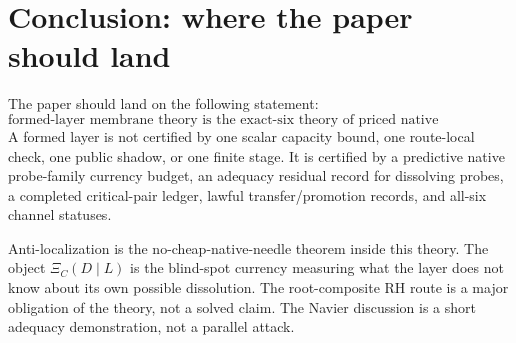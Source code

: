 \documentclass[11pt]{article}
\begin{document}
\section{Conclusion: where the paper should land}

The paper should land on the following statement:
\[
\boxed{\text{formed-layer membrane theory is the exact-six theory of priced native addressability.}}
\]
A formed layer is not certified by one scalar capacity bound, one route-local check, one public shadow, or one finite stage.  It is certified by a predictive native probe-family currency budget, an adequacy residual record for dissolving probes, a completed critical-pair ledger, lawful transfer/promotion records, and all-six channel statuses.

Anti-localization is the no-cheap-native-needle theorem inside this theory.  The object \(\Xi_C(D\mid L)\) is the blind-spot currency measuring what the layer does not know about its own possible dissolution.  The root-composite RH route is a major obligation of the theory, not a solved claim.  The Navier discussion is a short adequacy demonstration, not a parallel attack.
\end{document}
